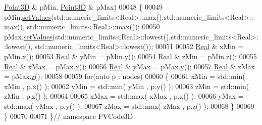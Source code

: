 \begin{DoxyCode}
      \hyperlink{classFVCode3D_1_1Point3D}{Point3D} & pMin, \hyperlink{classFVCode3D_1_1Point3D}{Point3D} & pMax)
00048 \{
00049     pMin.\hyperlink{classFVCode3D_1_1Point3D_af250a1c49cf1aeeb52f59a687257451d}{setValues}(std::numeric\_limits<Real>::max(),std::numeric\_limits<Real>::max(),
      std::numeric\_limits<Real>::max());
00050     pMax.\hyperlink{classFVCode3D_1_1Point3D_af250a1c49cf1aeeb52f59a687257451d}{setValues}(std::numeric\_limits<Real>::lowest(),std::numeric\_limits<Real>::lowest(),
      std::numeric\_limits<Real>::lowest());
00051 
00052     \hyperlink{namespaceFVCode3D_a40c1f5588a248569d80aa5f867080e83}{Real} & xMin = pMin.\hyperlink{classFVCode3D_1_1Point3D_ae015d6aa31f8b304f69696bdcbd4da19}{x}();
00053     \hyperlink{namespaceFVCode3D_a40c1f5588a248569d80aa5f867080e83}{Real} & yMin = pMin.\hyperlink{classFVCode3D_1_1Point3D_a950abcabbf3bb32fc2daf64c28d77416}{y}();
00054     \hyperlink{namespaceFVCode3D_a40c1f5588a248569d80aa5f867080e83}{Real} & zMin = pMin.\hyperlink{classFVCode3D_1_1Point3D_a865109e2006cc1de3681ab601081f5aa}{z}();
00055     \hyperlink{namespaceFVCode3D_a40c1f5588a248569d80aa5f867080e83}{Real} & xMax = pMax.\hyperlink{classFVCode3D_1_1Point3D_ae015d6aa31f8b304f69696bdcbd4da19}{x}();
00056     \hyperlink{namespaceFVCode3D_a40c1f5588a248569d80aa5f867080e83}{Real} & yMax = pMax.\hyperlink{classFVCode3D_1_1Point3D_a950abcabbf3bb32fc2daf64c28d77416}{y}();
00057     \hyperlink{namespaceFVCode3D_a40c1f5588a248569d80aa5f867080e83}{Real} & zMax = pMax.\hyperlink{classFVCode3D_1_1Point3D_a865109e2006cc1de3681ab601081f5aa}{z}();
00058 
00059     \textcolor{keywordflow}{for}(\textcolor{keyword}{auto} p : nodes)
00060     \{
00061         xMin = std::min( xMin , p.x() );
00062         yMin = std::min( yMin , p.y() );
00063         zMin = std::min( zMin , p.z() );
00064 
00065         xMax = std::max( xMax , p.x() );
00066         yMax = std::max( yMax , p.y() );
00067         zMax = std::max( zMax , p.z() );
00068     \}
00069 \}
00070 
00071 \}\textcolor{comment}{// namespace FVCode3D}
\end{DoxyCode}

